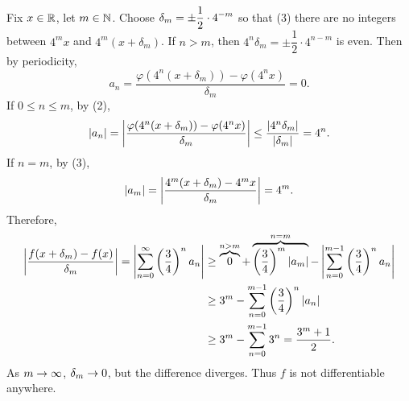 Fix \(x \in \mathbb{R}\), let \(m \in \mathbb{N}\). Choose \(\displaystyle \delta_m = \pm \frac{1}{2}\cdot 4^{-m}\) so that (3) there are no integers between \(4^mx\) and \(4^m(x + \delta_m)\). If \(n > m\), then \(4^n \delta_m = \pm \dfrac{1}{2}\cdot 4^{n - m}\) is even. Then by periodicity,
\[
    a_n = \frac{\varphi(4^n(x+\delta_m)) - \varphi(4^n x)}{\delta_m} = 0.
\]
If \(0 \leq n \leq m\), by (2),
\[
    \left| a_n \right| = \left| \frac{\varphi(4^n(x+\delta_m)) - \varphi(4^n x)}{\delta_m} \right| \leq \frac{\left| 4^n \delta_m \right|}{\left| \delta_m \right|} = 4^n.
\]
If \(n = m\), by (3),
\[
    \left| a_m \right| = \left| \frac{4^m(x + \delta_m) - 4^mx}{\delta_m} \right| = 4^m.
\]
Therefore,
\[
    \begin{aligned}
        \left| \frac{f(x + \delta_m) - f(x)}{\delta_m} \right| = \left| \sum_{n = 0}^\infty \left(\frac{3}{4}\right)^n a_n \right| & \geq \overbrace{0}^{n > m} + \overbrace{\left(\frac{3}{4}\right)^m \left| a_m \right|}^{n = m} - \left| \sum_{n=0}^{m-1}\left(\frac{3}{4}\right)^n a_n \right| \\
                                                                                                                 & \geq 3^m - \sum_{n=0}^{m-1} \left(\frac{3}{4}\right)^n \left| a_n \right|                                                                             \\
                                                                                                                 & \geq 3^m - \sum_{n=0}^{m-1} 3^n = \frac{3^m + 1}{2}.
    \end{aligned}
\]
As \(m \rightarrow \infty\), \(\delta_m \rightarrow 0\), but the difference diverges. Thus \(f\) is not differentiable anywhere.

\pagebreak

